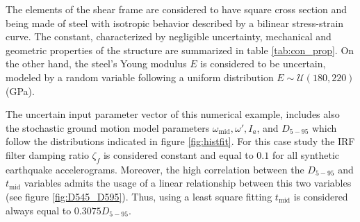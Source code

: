 \documentclass[12pt,a4paper,twocolumn,fleqn]{narms}
\begin{document}
\begin{table} 
\caption{Geometric and mechanical properties of the five-storey shear frame model.}\label{tab:con_prop}
\end{table}

The elements of the shear frame are considered to have square cross section and being made of steel with isotropic behavior described by a bilinear stress-strain curve. The constant, characterized by negligible uncertainty, mechanical and geometric properties of the structure are summarized in table \ref{tab:con_prop}. On the other hand, the steel's Young modulus $E$ is considered to be uncertain, modeled by a random variable following a uniform distribution $ E \sim {\mathcal U}(180,220)$ (GPa). 

The uncertain input parameter vector of this numerical example, includes also the stochastic ground motion model parameters $\omega_{\text{mid}}, \omega', I_a$, and $D_{5-95}$ which follow the distributions indicated in figure \ref{fig:histfit}. For this case study the IRF filter damping ratio $\zeta_f$ is considered constant and equal to $0.1$ for all synthetic earthquake accelerograms. Moreover, the high correlation between the $D_{5-95}$ and $t_{\text{mid}}$ variables admits the usage of a linear relationship between this two variables (see figure \ref{fig:D545_D595}). Thus, using a least square fitting $t_{\text{mid}}$ is considered always equal to $0.3075 D_{5-95}$.
\end{document}
